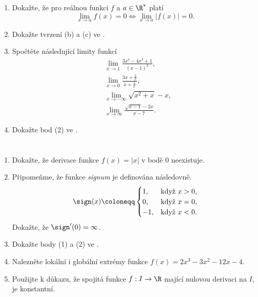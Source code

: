 \begin{enumerate}
 \item Dokažte, že pro reálnou funkci $f$ a $a \in \R^{*}$ platí
  \[
   \lim_{x \to a} f(x) = 0 \Leftrightarrow \lim_{x \to a} |f(x)| = 0.
  \]
 \item Dokažte tvrzení (b) a (c) ve .
 \item Spočtěte následující limity funkcí
  \begin{align*}
   &\lim_{x \to 1} \frac{3x^{4} - 4x^3 + 1}{(x-1)^2},\\
   &\lim_{x \to 0} \frac{3x + \frac{2}{x}}{x + \frac{4}{x}},\\
   &\lim_{x \to -\infty} \sqrt{x^2 + x} - x,\\
   &\lim_{x \to \infty} \frac{\sqrt{x-1}-2x}{x-7}.
  \end{align*}
 \item Dokažte bod (2) ve .
\end{enumerate}

\section*{}
\begin{enumerate}
 \item Dokažte, že derivace funkce $f(x) = |x|$ v bodě $0$ neexistuje.
 \item Připomeňme, že funkce \emph{signum} je definována následovně.
  \[
   \sign(x) \coloneqq \begin{cases}
    1,& \text{když } x > 0,\\
    0,& \text{když } x = 0,\\
    -1,& \text{když } x < 0.
   \end{cases}
  \]
  Dokažte, že $\sign'(0) = \infty$.
 \item Dokažte body (1) a (2) ve .
 \item Nalezněte lokální i globální extrémy funkce $f(x) = 2 x^{3} - 3 x^{2} - 12 x -
  4$.
 \item Použijte  k důkazu, že
  spojitá funkce $f:I \to \R$ mající nulovou derivaci na $I$, je konstantní.
\end{enumerate}

